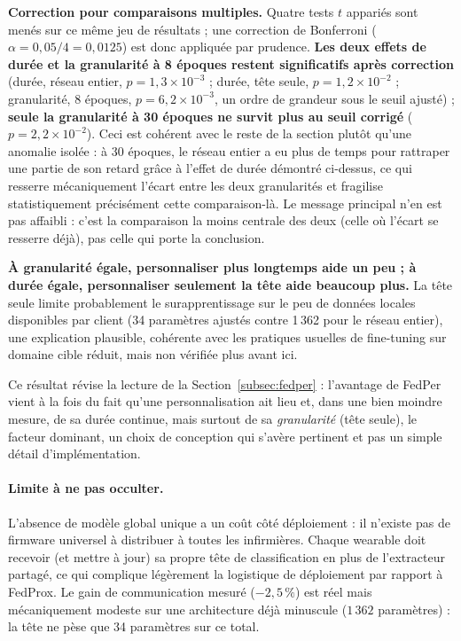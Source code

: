 \documentclass{article}
\begin{document}
\textbf{Correction pour comparaisons multiples.} Quatre tests $t$ appariés sont menés
sur ce même jeu de résultats ; une correction de Bonferroni ($\alpha = 0{,}05/4 =
0{,}0125$) est donc appliquée par prudence. \textbf{Les deux effets de durée et la
granularité à 8 époques restent significatifs après correction} (durée, réseau entier,
$p=1{,}3\times10^{-3}$ ; durée, tête seule, $p=1{,}2\times10^{-2}$ ; granularité,
8 époques, $p=6{,}2\times10^{-3}$, un ordre de grandeur sous le seuil ajusté) ; \textbf{
seule la granularité à 30 époques ne survit plus au seuil corrigé}
($p=2{,}2\times10^{-2}$). Ceci est cohérent avec le reste de la section plutôt qu'une
anomalie isolée : à 30 époques, le réseau entier a eu plus de temps pour rattraper une
partie de son retard grâce à l'effet de durée démontré ci-dessus, ce qui resserre
mécaniquement l'écart entre les deux granularités et fragilise statistiquement
précisément cette comparaison-là. Le message principal n'en est pas affaibli : c'est la
comparaison la moins centrale des deux (celle où l'écart se resserre déjà), pas celle
qui porte la conclusion.

\textbf{À granularité égale, personnaliser plus longtemps aide un peu ; à durée égale,
personnaliser seulement la tête aide beaucoup plus.} La tête seule limite probablement
le surapprentissage sur le peu de données locales disponibles par client (34
paramètres ajustés contre 1\,362 pour le réseau entier), une explication plausible,
cohérente avec les pratiques usuelles de fine-tuning sur domaine cible réduit, mais non
vérifiée plus avant ici.

Ce résultat révise la lecture de la Section~\ref{subsec:fedper} : l'avantage de FedPer
vient à la fois du fait qu'une personnalisation ait lieu et, dans une bien moindre
mesure, de sa durée continue, mais surtout de sa \emph{granularité} (tête seule), le
facteur dominant, un choix de conception qui s'avère pertinent et pas un simple détail
d'implémentation.

\paragraph{Limite à ne pas occulter.} L'absence de modèle global unique a un coût côté
déploiement : il n'existe pas de firmware universel à distribuer à toutes les
infirmières. Chaque wearable doit recevoir (et mettre à jour) sa propre tête de
classification en plus de l'extracteur partagé, ce qui complique légèrement la logistique
de déploiement par rapport à FedProx. Le gain de communication mesuré ($-2{,}5\,\%$) est
réel mais mécaniquement modeste sur une architecture déjà minuscule ($1\,362$
paramètres) : la tête ne pèse que 34 paramètres sur ce total.
\end{document}
